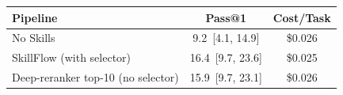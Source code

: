 \begin{tabular}{lcc}
  \toprule
  \textbf{Pipeline} & \textbf{Pass@1} & \textbf{Cost/Task} \\
  \midrule
  No Skills & 9.2{\scriptsize~[4.1, 14.9]} & \$0.026 \\
  SkillFlow (with selector) & 16.4{\scriptsize~[9.7, 23.6]} & \$0.025 \\
  Deep-reranker top-10 (no selector) & 15.9{\scriptsize~[9.7, 23.1]} & \$0.026 \\
  \bottomrule
\end{tabular}

